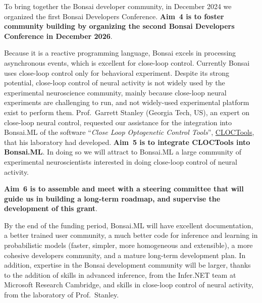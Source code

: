 To bring together the Bonsai developer community, in December 2024 we organized
the first Bonsai Developers Conference. \textbf{Aim~4 is to foster community
building by organizing the second Bonsai Developers Conference in December
2026}.

Because it is a reactive programming language, Bonsai excels in processing
asynchronous events, which is excellent for close-loop control. Currently
Bonsai uses close-loop control only for behavioral experiment.
%
Despite its strong potential, close-loop control of neural activity is not
widely used by the experimental neuroscience community, mainly because
close-loop neural experiments are challenging to run, and not widely-used
experimental platform exist to perform them.
%
Prof.~Garrett Stanley (Georgia Tech, US), an expert on close-loop neural
control, requested our assistance for the integration into Bonsai.ML of the
software ``\emph{Close Loop Optogenetic Control Tools}'',
\href{https://cloctools.github.io/}{CLOCTools}, that his laboratory had
developed. \textbf{Aim~5 is to integrate CLOCTools into Bonsai.ML}.
%
In doing so we will attract to Bonsai.ML a large community of experimental
neuroscientists interested in doing close-loop control of neural activity.

\textbf{Aim~6 is to assemble and meet with a steering committee that will guide
us in building a long-term roadmap, and supervise the development of this
grant}.

By the end of the funding period, Bonsai.ML will have excellent documentation,
a better trained user community, a much better code for inference and learning
in probabilistic models (faster, simpler, more homogeneous and extensible), a
more cohesive developers community, and a mature long-term development plan.
%
In addition, expertise in the Bonsai development community will be larger,
thanks to the addition of skills in advanced inference, from the Infer.NET team
at Microsoft Research Cambridge, and skills in close-loop control of neural
activity, from the laboratory of Prof.~Stanley.
